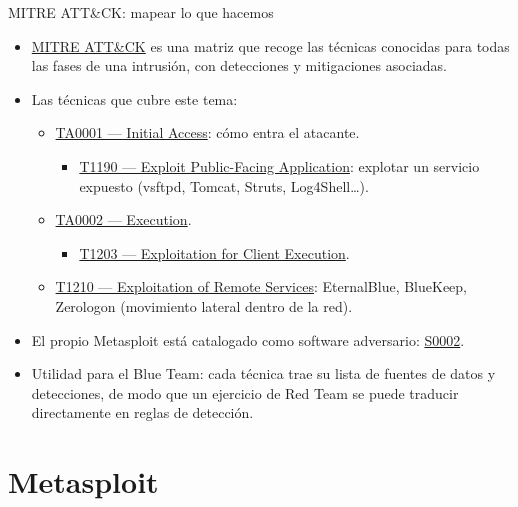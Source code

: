 \documentclass[aspectratio=169,11pt]{beamer}
\begin{document}
\begin{frame}{MITRE ATT\&CK: mapear lo que hacemos}
\footnotesize
  \begin{itemize}\setlength{\itemsep}{0.35em}
  \item \href{https://attack.mitre.org/}{MITRE ATT\&CK} es una matriz que recoge las técnicas conocidas para todas las fases de una intrusión, con detecciones y mitigaciones asociadas.
  \item Las técnicas que cubre este tema:
    \begin{itemize}
    \item \href{https://attack.mitre.org/tactics/TA0001/}{TA0001 --- Initial Access}: cómo entra el atacante.
      \begin{itemize}
      \item \href{https://attack.mitre.org/techniques/T1190/}{T1190 --- Exploit Public-Facing Application}: explotar un servicio expuesto (vsftpd, Tomcat, Struts, Log4Shell\dots).
      \end{itemize}
    \item \href{https://attack.mitre.org/tactics/TA0002/}{TA0002 --- Execution}.
      \begin{itemize}
      \item \href{https://attack.mitre.org/techniques/T1203/}{T1203 --- Exploitation for Client Execution}.
      \end{itemize}
    \item \href{https://attack.mitre.org/techniques/T1210/}{T1210 --- Exploitation of Remote Services}: EternalBlue, BlueKeep, Zerologon (movimiento lateral dentro de la red).
    \end{itemize}
  \item El propio Metasploit está catalogado como software adversario: \href{https://attack.mitre.org/software/S0002/}{S0002}.
  \item Utilidad para el Blue Team: cada técnica trae su lista de fuentes de datos y detecciones, de modo que un ejercicio de Red Team se puede traducir directamente en reglas de detección.
  \end{itemize}
\end{frame}

\section{Metasploit}
\end{document}
